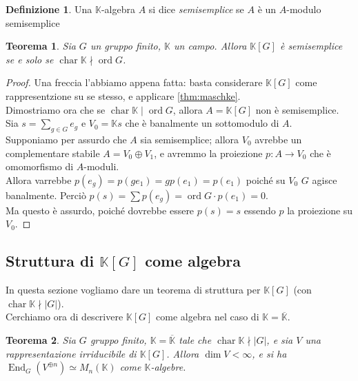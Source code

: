 \documentclass[11pt]{article}
\theoremstyle{plain}
\newtheorem{thm}{Teorema}[section]
\theoremstyle{definition}
\newtheorem{defn}{Definizione}[section]
\theoremstyle{remark}
\newcommand{\K}{\mathbb{K}}
\DeclareMathOperator{\End}{End}
\DeclareMathOperator{\Char}{char}
\DeclareMathOperator{\ord}{ord}
\DeclareMathOperator{\iso}{\simeq}
\begin{document}
   \begin{defn}
    Una $\K$-algebra $A$ si dice \emph{semisemplice} se $A$ è un $A$-modulo semisemplice
   \end{defn}
   \begin{thm}
    Sia $G$ un gruppo finito, $\K$ un campo. Allora $\K[G]$ è semisemplice se e solo se $\Char\K\nmid\ord G$.
   \end{thm}
   \begin{proof}
    Una freccia l'abbiamo appena fatta: basta considerare $\K[G]$ come rappresentzione su se stesso, e applicare \ref{thm:maschke}.\\
    Dimostriamo ora che se $\Char\K\mid\ord G$, allora $A=\K[G]$ non è semisemplice.
    Sia $s=\sum_{g\in G}e_g$ e $V_0=\K s$ che è banalmente un sottomodulo di $A$.\\
    Supponiamo per assurdo che $A$ sia semisemplice; allora $V_0$ avrebbe un complementare stabile $A=V_0\oplus V_1$, e avremmo la proiezione $p:A\to V_0$ che è omomorfismo di $A$-moduli.\\
    Allora varrebbe $p(e_g)=p(ge_1)=gp(e_1)=p(e_1)$ poiché su $V_0$ $G$ agisce banalmente. Perciò $p(s)=\sum p(e_g)=\ord G\cdot p(e_1)=0$.\\
    Ma questo è assurdo, poiché dovrebbe essere $p(s)=s$ essendo $p$ la proiezione su $V_0$.
    
   \end{proof}




\subsection{Struttura di $\K[G]$ come algebra}
In questa sezione vogliamo dare un teorema di struttura per $\K[G]$ (con $\Char \K  \nmid |G|$).\\
Cerchiamo ora di descrivere $\K[G]$ come algebra nel caso di $\K=\overline{\K}$.
\begin{thm}\label{thm:end_matrici}
	Sia $G$ gruppo finito, $\K=\overline{\K}$ tale che $\Char \K \nmid |G|$, e sia $V$ una rappresentazione irriducibile di $\K[G]$. Allora $\dim V <\infty$, e si ha $\End_G(V^{\oplus n}) \iso M_n(\K)$ come $\K$-algebre.
\end{thm}
\end{document}
